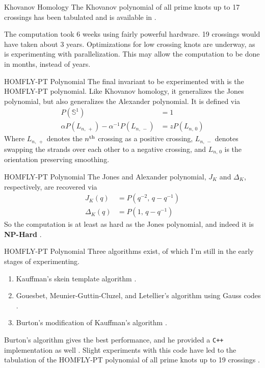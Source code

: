 \documentclass{beamer}
\begin{document}
    \begin{frame}{Khovanov Homology}
        The Khovanov polynomial of all prime knots up to 17 crossings has been
        tabulated and is available in \cite{KhovanovData}.
        \par\hfill\par
        The computation took 6 weeks using fairly powerful hardware.
        19 crossings would have taken about 3 years. Optimizations for low
        crossing knots are underway, as is experimenting with parallelization.
        This may allow the computation to be done in months, instead of years.
    \end{frame}
    \begin{frame}{HOMFLY-PT Polynomial}
        The final invariant to be experimented with is the HOMFLY-PT
        polynomial. Like Khovanov homology, it generalizes the Jones polynomial,
        but also generalizes the Alexander polynomial. It is defined via
        \begin{align}
            P(\mathbb{S}^{1})&=1\\
            \alpha{P}(L_{n,\,+})-\alpha^{-1}P(L_{n,\,-})
            &=zP(L_{n,\,0})
        \end{align}
        Where $L_{n,\,+}$ denotes the $n^{\small\textrm{th}}$ crossing as a
        positive crossing, $L_{n,\,-}$ denotes swapping the strands over each
        other to a negative crossing, and $L_{n,\,0}$ is the
        orientation preserving smoothing.
    \end{frame}
    \begin{frame}{HOMFLY-PT Polynomial}
        The Jones and Alexander polynomial, $J_{K}$ and $\Delta_{K}$,
        respectively, are recovered via
        \begin{align}
            J_{K}(q)&=P(q^{-2},\,q-q^{-1})\\
            \Delta_{K}(q)&=P(1,\,q-q^{-1})
        \end{align}
        So the computation is at least as hard as the Jones polynomial, and
        indeed it is \textbf{NP-Hard} \cite{HOMFLYPTNPHard}.
    \end{frame}
    \begin{frame}{HOMFLY-PT Polynomial}
        Three algorithms exist, of which I'm still in the early stages of
        experimenting.
        \begin{enumerate}
            \item Kauffman's skein template algorithm \cite{KauffmanStateModelsLinkPolynomials}.
            \item Gouesbet, Meunier-Guttin-Cluzel, and Letellier's algorithm using Gauss codes \cite{GOUESBET1999271}.
            \item Burton's modification of Kauffman's algorithm \cite{Burton2018HOMFLFixedParameter}.
        \end{enumerate}
        Burton's algorithm gives the best performance, and he provided a
        \texttt{C++} implementation as well \cite{regina}. Slight experiments
        with this code have led to the tabulation of the HOMFLY-PT polynomial
        of all prime knots up to 19 crossings
        \cite{HOMFLYData}.
    \end{frame}
\end{document}
